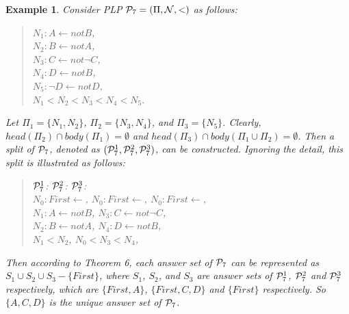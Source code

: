 \documentclass{tlp}
\newtheorem{example}{Example} %
\begin{document}
\begin{example}
Consider PLP ${\cal P}_{7}=(\Pi, {\cal N},<)$ as follows:
\begin{quote}
$N_{1}: A\leftarrow not B$,\\
\hspace*{.1in} $N_{2}: B\leftarrow not A$,\\
\hspace*{.1in} $N_{3}: C\leftarrow not \neg C$, \\
\hspace*{.1in} $N_{4}: D\leftarrow not B$,\\
\hspace*{.1in} $N_{5}: \neg D\leftarrow not D$,\\
\hspace*{.1in} $N_{1}<N_{2}<N_{3}<N_{4}<N_{5}$.
\end{quote}
Let $\Pi_{1}=\{N_{1}, N_{2}\}$, $\Pi_{2}=\{N_{3}, N_{4}\}$, and $\Pi_{3}=\{N_{5}\}$.
Clearly, $head(\Pi_{2})\cap body(\Pi_{1})=\emptyset$ and
$head(\Pi_{3})\cap body(\Pi_{1}\cup \Pi_{2})=\emptyset$. Then a split
of ${\cal P}_{7}$, denoted as
$({\cal P}_{7}^{1}, {\cal P}_{7}^{2}, {\cal P}_{7}^{3})$,
can be constructed. Ignoring the detail,
this split is illustrated as follows:
\begin{quote}
${\cal P}_{7}^{1}$: \hspace*{1.in}
${\cal P}_{7}^{2}$: \hspace*{1.in} ${\cal P}_{7}^{3}$:\\
\hspace*{.1in} $N_{0}: First\leftarrow$,  \hspace*{.45in} $N_{0}: First\leftarrow$,
\hspace*{.5in} $N_{0}: First\leftarrow$, \\
\hspace*{.1in} $N_{1}: A\leftarrow not B$,
\hspace*{.3in} $N_{3}: C\leftarrow not \neg C$, \\
\hspace*{.1in} $N_{2}: B\leftarrow not A$,
\hspace*{.3in} $N_{4}: D\leftarrow not B$,\\
\hspace*{.1in} $N_{1}<N_{2}$,
\hspace*{.65in} $N_{0}<N_{3}<N_{4}$,
\end{quote} 
Then according to Theorem 6,
each answer set of ${\cal P}_{7}$
can be represented as $S_{1}\cup S_{2}\cup S_{3} - \{First\}$,
where $S_{1}$, $S_{2}$, and $S_{3}$ are answer sets of
${\cal P}_{7}^{1}$, ${\cal P}_{7}^{2}$ and
${\cal P}_{7}^{3}$ respectively, which are
$\{First, A\}$, $\{First, C, D\}$ and $\{First\}$ respectively.
So $\{A, C, D\}$ is the unique answer set of ${\cal P}_{7}$.
\end{example}
\end{document}
